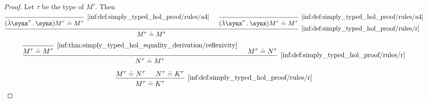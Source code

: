 \begin{proof}
   Let \( \tau \) be the type of \( M^\tau \). Then
  \begin{equation*}
    \begin{prooftree}
      \infer0[\ref{inf:def:simply_typed_hol_proof/rules/a4}]{ (\qabs {\synx^\tau} \synx) M^\tau \syneq M^\tau }
      \infer0[\ref{inf:def:simply_typed_hol_proof/rules/a4}]{ (\qabs {\synx^\tau} \synx) M^\tau \syneq M^\tau }
      \infer2[\ref{inf:def:simply_typed_hol_proof/rules/r}]{ M^\tau \syneq M^\tau }
    \end{prooftree}
  \end{equation*}

  \begin{equation*}
    \begin{prooftree}
      \infer0[\ref{inf:thm:simply_typed_hol_equality_derivation/reflexivity}]{ M^\tau \syneq M^\tau }
      \hypo{ M^\tau \syneq N^\tau }
      \infer2[\ref{inf:def:simply_typed_hol_proof/rules/r}]{ N^\tau \syneq M^\tau }
    \end{prooftree}
  \end{equation*}

  \begin{equation*}
    \begin{prooftree}
      \hypo{ M^\tau \syneq N^\tau }
      \hypo{ N^\tau \syneq K^\tau }
      \infer2[\ref{inf:def:simply_typed_hol_proof/rules/r}]{ M^\tau \syneq K^\tau }
    \end{prooftree}
  \end{equation*}
\end{proof}

